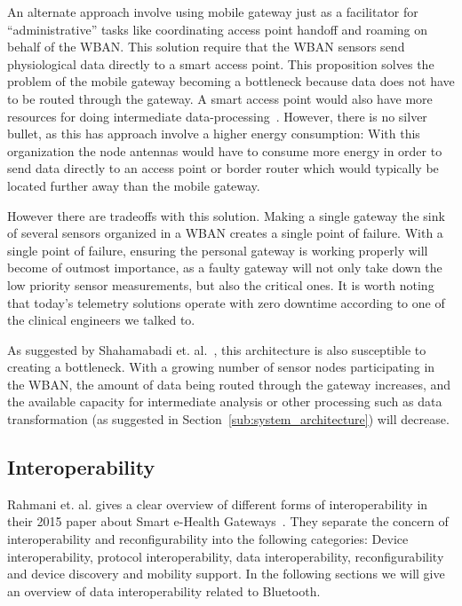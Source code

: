 An alternate approach involve using mobile gateway just as a facilitator for ``administrative'' tasks like coordinating access point handoff and roaming on behalf of the WBAN. This solution require that the WBAN sensors send physiological data directly to a smart access point. This proposition solves the problem of the mobile gateway becoming a bottleneck because data does not have to be routed through the gateway. A smart access point would also have more resources for doing intermediate data-processing~\cite{DrAmirMohammadRahmani:2014vx}. However, there is no silver bullet, as this has approach involve a higher energy consumption: With this organization the node antennas would have to consume more energy in order to send data directly to an access point or border router which would typically be located further away than the mobile gateway. 

However there are tradeoffs with this solution. Making a single gateway the sink of several sensors organized in a WBAN creates a single point of failure. With a single point of failure, ensuring the personal gateway is working properly will become of outmost importance, as a faulty gateway will not only take down the low priority sensor measurements, but also the critical ones. It is worth noting that today's telemetry solutions operate with zero downtime according to one of the clinical engineers we talked to.

As suggested by Shahamabadi et. al.~\cite{Shahamabadi:2013df}, this architecture is also susceptible to creating a bottleneck. With a growing number of sensor nodes participating in the WBAN, the amount of data being routed through the gateway increases, and the available capacity for intermediate analysis or other processing such as data transformation (as suggested in Section~\ref{sub:system_architecture}) will decrease. 


\subsection{Interoperability} %
\label{sub:interoperability}

Rahmani et. al. gives a clear overview of different forms of interoperability in their 2015 paper about Smart e-Health Gateways~\cite{DrAmirMohammadRahmani:2014vx}. They separate the concern of interoperability and reconfigurability into the following categories: Device interoperability, protocol interoperability, data interoperability, reconfigurability and device discovery and mobility support. In the following sections we will give an overview of data interoperability related to Bluetooth.

